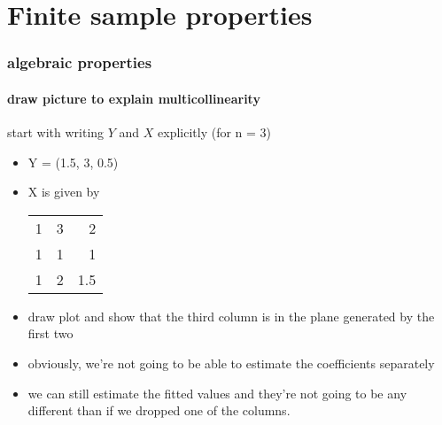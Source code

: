 

\part*{Finite sample properties}%

\section{algebraic properties}
\subsection{draw picture to explain multicollinearity}

start with writing $Y$ and $X$ explicitly (for n = 3)
\begin{itemize}
\item Y = (1.5, 3, 0.5)
\item X is given by

  \begin{center}
    \begin{tabular}{rrr}
      1  &  3  &    2  \\
      1  &  1  &    1  \\
      1  &  2  &  1.5  \\
    \end{tabular}
  \end{center}

\item draw plot and show that the third column is in the plane
  generated by the first two
\item obviously, we're not going to be able to estimate the
  coefficients separately
\item we can still estimate the fitted values and they're not going to
  be any different than if we dropped one of the columns.
\end{itemize}

